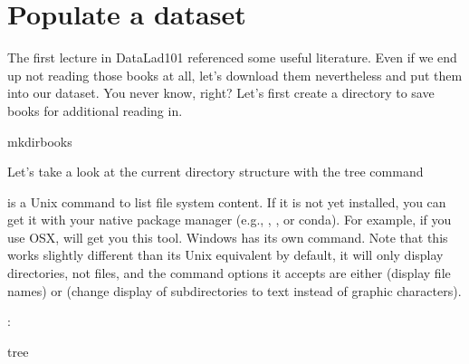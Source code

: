 \sphinxstepscope


\section{Populate a dataset}
\label{\detokenize{basics/101-102-populate:populate-a-dataset}}\label{\detokenize{basics/101-102-populate:populate}}\label{\detokenize{basics/101-102-populate::doc}}
\sphinxAtStartPar
The first lecture in DataLad\sphinxhyphen{}101 referenced some useful literature.
Even if we end up not reading those books at all, let’s download
them nevertheless and put them into our dataset. You never know, right?
Let’s first create a directory to save books for additional reading in.

\begin{sphinxVerbatim}[commandchars=\\\{\}]
mkdirbooks
\end{sphinxVerbatim}

\ignorespaces 
\sphinxAtStartPar
Let’s take a look at the current directory structure with the tree command%
\begin{footnote}\sphinxAtStartFootnote
{} is a Unix command to list file system content. If it is not yet installed,
you can get it with your native package manager (e.g.,  , , or conda).
For example, if you use OSX,   will get you this tool.
Windows has its own  command.
Note that this  works slightly different than its Unix equivalent \sphinxhyphen{} by default, it will only display directories, not files, and the command options it accepts are either  (display file names) or  (change display of subdirectories to text instead of graphic characters).
%
\end{footnote}:

\begin{sphinxVerbatim}[commandchars=\\\{\}]
tree

\end{sphinxVerbatim}

